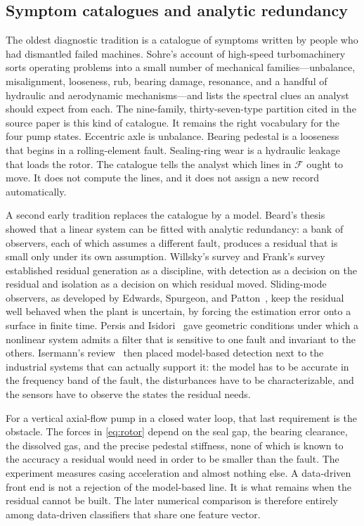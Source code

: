\subsection{Symptom catalogues and analytic redundancy}

The oldest diagnostic tradition is a catalogue of symptoms written by people who had dismantled failed machines.
Sohre's account of high-speed turbomachinery~\cite{sohre1968,rao2011} sorts operating problems into a small number of mechanical families---unbalance, misalignment, looseness, rub, bearing damage, resonance, and a handful of hydraulic and aerodynamic mechanisms---and lists the spectral clues an analyst should expect from each.
The nine-family, thirty-seven-type partition cited in the source paper is this kind of catalogue.
It remains the right vocabulary for the four pump states.
Eccentric axle is unbalance.
Bearing pedestal is a looseness that begins in a rolling-element fault.
Sealing-ring wear is a hydraulic leakage that loads the rotor.
The catalogue tells the analyst which lines in \(\mathcal{F}\) ought to move.
It does not compute the lines, and it does not assign a new record automatically.

A second early tradition replaces the catalogue by a model.
Beard's thesis~\cite{beard1971} showed that a linear system can be fitted with analytic redundancy: a bank of observers, each of which assumes a different fault, produces a residual that is small only under its own assumption.
Willsky's survey and Frank's survey~\cite{willsky1976,frank1990} established residual generation as a discipline, with detection as a decision on the residual and isolation as a decision on which residual moved.
Sliding-mode observers, as developed by Edwards, Spurgeon, and Patton~\cite{edwards2000}, keep the residual well behaved when the plant is uncertain, by forcing the estimation error onto a surface in finite time.
Persis and Isidori~\cite{persis2001} gave geometric conditions under which a nonlinear system admits a filter that is sensitive to one fault and invariant to the others.
Isermann's review~\cite{isermann2005} then placed model-based detection next to the industrial systems that can actually support it: the model has to be accurate in the frequency band of the fault, the disturbances have to be characterizable, and the sensors have to observe the states the residual needs.

For a vertical axial-flow pump in a closed water loop, that last requirement is the obstacle.
The forces in \eqref{eq:rotor} depend on the seal gap, the bearing clearance, the dissolved gas, and the precise pedestal stiffness, none of which is known to the accuracy a residual would need in order to be smaller than the fault.
The experiment measures casing acceleration and almost nothing else.
A data-driven front end is not a rejection of the model-based line.
It is what remains when the residual cannot be built.
The later numerical comparison is therefore entirely among data-driven classifiers that share one feature vector.

